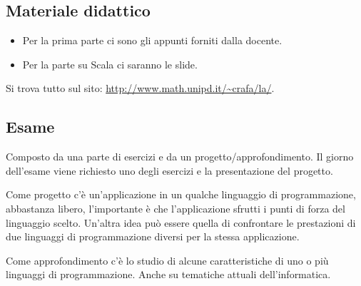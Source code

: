 \subsection{Materiale didattico}

\begin{itemize}
	\item Per la prima parte ci sono gli appunti forniti dalla docente.
	\item Per la parte su Scala ci saranno le slide.
\end{itemize}

\noindent Si trova tutto sul sito: \url{http://www.math.unipd.it/~crafa/la/}.

\subsection{Esame}

Composto da una parte di esercizi e da un progetto/approfondimento. Il giorno dell'esame viene richiesto uno degli esercizi e la presentazione del progetto.

Come progetto c'è un'applicazione in un qualche linguaggio di programmazione, abbastanza libero, l'importante è che l'applicazione sfrutti i punti di forza del linguaggio scelto. Un'altra idea può essere quella di confrontare le prestazioni di due linguaggi di programmazione diversi per la stessa applicazione.

Come approfondimento c'è lo studio di alcune caratteristiche di uno o più linguaggi di programmazione. Anche su tematiche attuali dell'informatica.


